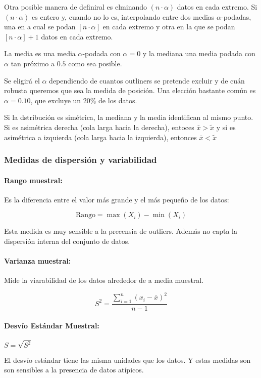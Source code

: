 Otra posible manera de definiral es elminando $(n\cdot\alpha)$ datos en cada extremo. Si $(n\cdot\alpha)$ es entero y, cuando no lo es, interpolando entre dos medias $\alpha$-podadas, una en a cual se podan $[n\cdot\alpha]$ en cada extremo y otra en la que se podan $[n\cdot\alpha]+1$ datos en cada extremo.

La media es una media $\alpha$-podada con $\alpha = 0$ y la mediana una media podada con $\alpha$ tan próximo a $0.5$ como sea posible.

Se eligirá el $\alpha$ dependiendo de cuantos outliners se pretende excluir y de cuán robusta queremos que sea la medida de posición. Una elección bastante común es $\alpha = 0.10$, que excluye un $20\%$ de los datos.

Si la dstribución es simétrica, la mediana y la media identifican al mismo punto. Si es asimétrica derecha (cola larga hacia la derecha), entoces $\bar{x} > \tilde{x}$ y si es asimétrica a izquierda (cola larga hacia la izquierda), entonces $\bar{x} < \tilde{x}$

\subsubsection{Medidas de dispersión y variabilidad}

\paragraph{Rango muestral:} Es la diferencia entre el valor más grande y el más pequeño de los datos:

$$\text{Rango} = \max(X_i) - \min(X_i)$$

Esta medida es muy sensible a la precensia de outliers. Además no capta la dispersión interna del conjunto de datos.

\paragraph{Varianza muestral:} Mide la viarabilidad de los datos alrededor de a media muestral.
 
 $$S^2 = \frac{\sum\limits_{i=1}^{n}(x_i-\bar{x})^2}{n-1}$$

\paragraph{Desvío Estándar Muestral:}  $S = \sqrt{S^2}$

El desvío estándar tiene las misma unidades que los datos. Y estas medidas son son sensibles a la presencia de datos atípicos.


